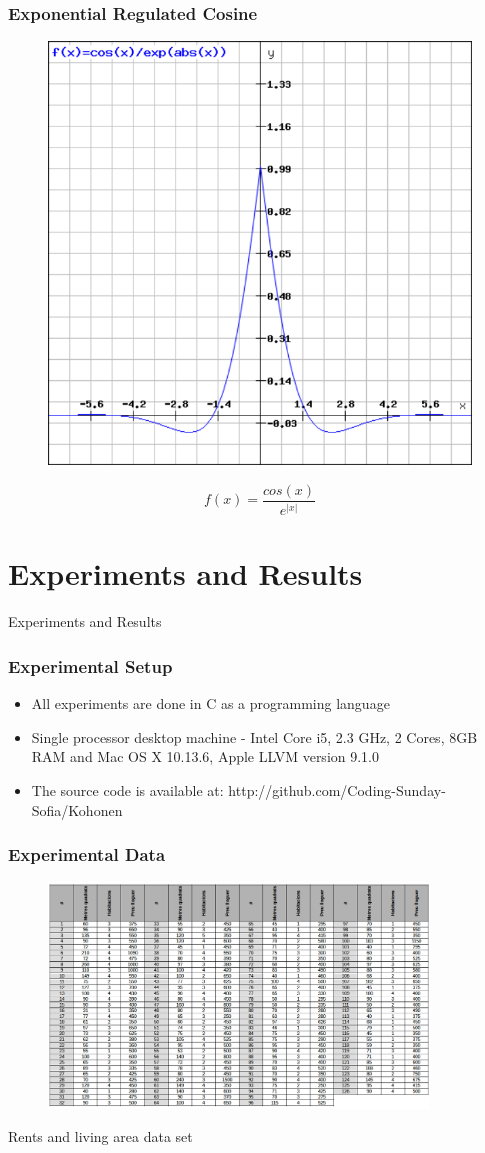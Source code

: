 \documentclass{beamer}
\begin{document}
\begin{frame}
\frametitle{Exponential Regulated Cosine}
\begin{figure}[h]
  \centering
  \includegraphics[width=0.45\linewidth]{fig01b}
\label{fig01b}
\end{figure}
\begin{equation} \label{equ02}
f(x) = \frac{cos(x)}{e^{|x|}}
\end{equation}
\end{frame}

\section{Experiments and Results}

\begin{frame}
\center \huge{Experiments and Results}
\end{frame}

\begin{frame}
\frametitle{Experimental Setup}
\begin{itemize}
  \item All experiments are done in C as a programming language
  \item Single processor desktop machine - Intel Core i5, 2.3 GHz, 2 Cores, 8GB RAM and Mac OS X 10.13.6, Apple LLVM version 9.1.0
  \item The source code is available at: 
  http://github.com/Coding-Sunday-Sofia/Kohonen
\end{itemize}
\end{frame}

\begin{frame}
\frametitle{Experimental Data}
\begin{figure}[h]
  \centering
  \includegraphics[width=0.9\textwidth]{fig03}
  \label{fig03}
\end{figure}
Rents and living area data set
\end{frame}
\end{document}
